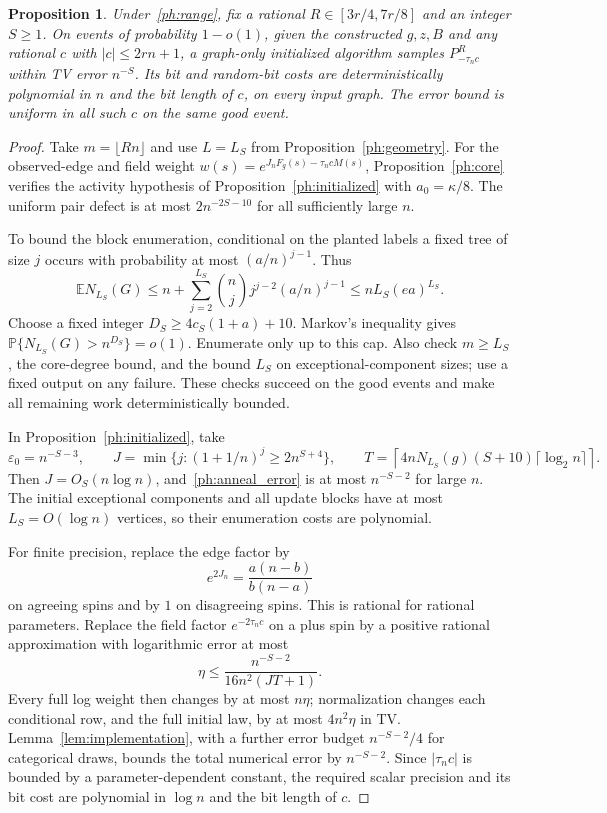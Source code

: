 \documentclass[11pt]{article}
\def\P{\mathbb{P}}
\def\E{\mathbb{E}}
\newtheorem{proposition}[thm]{Proposition}
\numberwithin{equation}{section}
\begin{document}
\begin{proposition}\label{ph:ball_sampler}
Under~\eqref{ph:range}, fix a rational $R\in[3r/4,7r/8]$ and an integer $S\ge1$. On events of probability $1-o(1)$, given the constructed $g,z,B$ and any rational $c$ with $|c|\le2rn+1$, a graph-only initialized algorithm samples $P_{-\tau_nc}^R$ within TV error $n^{-S}$. Its bit and random-bit costs are deterministically polynomial in $n$ and the bit length of $c$, on every input graph. The error bound is uniform in all such $c$ on the same good event.
\end{proposition}

\begin{proof}
Take $m=\lfloor Rn\rfloor$ and use $L=L_S$ from Proposition~\ref{ph:geometry}. For the observed-edge and field weight $w(s)=e^{J_nF_g(s)-\tau_ncM(s)}$, Proposition~\ref{ph:core} verifies the activity hypothesis of Proposition~\ref{ph:initialized} with $a_0=\kappa/8$. The uniform pair defect is at most $2n^{-2S-10}$ for all sufficiently large $n$.

To bound the block enumeration, conditional on the planted labels a fixed tree of size $j$ occurs with probability at most $(a/n)^{j-1}$. Thus
\[
 \E N_{L_S}(G)\le n+\sum_{j=2}^{L_S}\binom{n}{j}j^{j-2}(a/n)^{j-1}
       \le nL_S(ea)^{L_S}.
\]
Choose a fixed integer $D_S\ge4c_S(1+a)+10$. Markov's inequality gives
$\P\{N_{L_S}(G)>n^{D_S}\}=o(1)$. Enumerate only up to this cap. Also check $m\ge L_S$, the core-degree bound, and the bound $L_S$ on exceptional-component sizes; use a fixed output on any failure. These checks succeed on the good events and make all remaining work deterministically bounded.

In Proposition~\ref{ph:initialized}, take
\[
 \varepsilon_0=n^{-S-3},\qquad
 J=\min\{j:(1+1/n)^j\ge2n^{S+4}\},\qquad
 T=\left\lceil4nN_{L_S}(g)(S+10)\lceil\log_2n\rceil\right\rceil.
\]
Then $J=O_S(n\log n)$, and~\eqref{ph:anneal_error} is at most $n^{-S-2}$ for large $n$. The initial exceptional components and all update blocks have at most $L_S=O(\log n)$ vertices, so their enumeration costs are polynomial.

For finite precision, replace the edge factor by
\[
    e^{2J_n}=\frac{a(n-b)}{b(n-a)}
\]
on agreeing spins and by $1$ on disagreeing spins. This is rational for rational parameters. Replace the field factor $e^{-2\tau_nc}$ on a plus spin by a positive rational approximation with logarithmic error at most
\[
    \eta\le\frac{n^{-S-2}}{16n^2(JT+1)}.
\]
Every full log weight then changes by at most $n\eta$; normalization changes each conditional row, and the full initial law, by at most $4n^2\eta$ in TV. Lemma~\ref{lem:implementation}, with a further error budget $n^{-S-2}/4$ for categorical draws, bounds the total numerical error by $n^{-S-2}$. Since $|\tau_nc|$ is bounded by a parameter-dependent constant, the required scalar precision and its bit cost are polynomial in $\log n$ and the bit length of $c$.


\end{proof}
\end{document}
